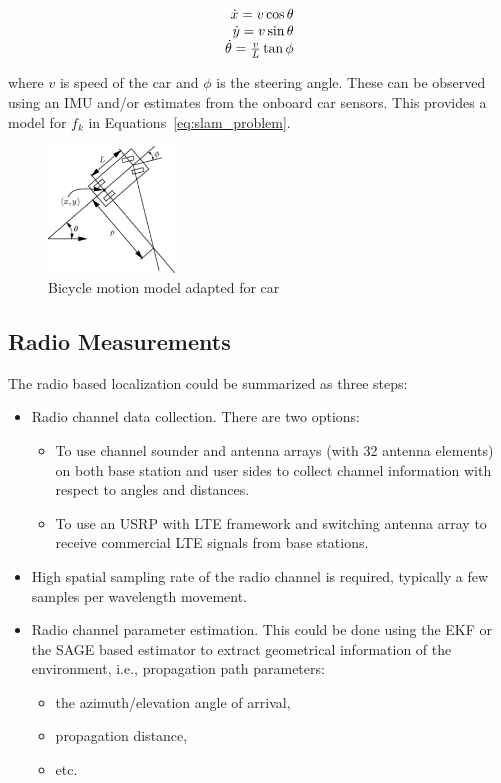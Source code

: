 \begin{equation}
 \begin{array}[b]{r}
  \dot{x}  = v \cos \theta \\
  \dot{y}  = v \sin \theta \\
  \dot{\theta}  = \frac{v}{L} \tan{\phi}
 \end{array}
\end{equation}

where $v$ is speed of the car and $\phi$ is the steering angle.
These can be observed using an \gls{IMU} and/or estimates from the onboard car
sensors. This provides a model for $f_k$ in Equations~\eqref{eq:slam_problem}.

\begin{figure}
\centering
\label{fig:motion_model}
\includegraphics[width=0.3\textwidth]{figures/bicycle_model.pdf}
\caption{Bicycle motion model adapted for car}
\end{figure}


\subsection{Radio Measurements}\label{sec:radio_measurements}


The radio based localization could be summarized as three steps:

\begin{itemize}
\item Radio channel data collection. There are two options:
  \begin{itemize}
  \item To use channel sounder and antenna arrays (with 32 antenna
    elements) on both base station and user sides to collect channel
    information with respect to angles and distances.
  \item To use an \gls{USRP} with \gls{LTE} framework and switching antenna array to
  receive commercial \gls{LTE} signals from base stations.
\end{itemize}
\item  High spatial sampling rate of the radio channel is required, typically a few samples per wavelength movement.
\item Radio channel parameter estimation. This could be done using the \gls{EKF} or the
\gls{SAGE} based estimator
to extract geometrical information of the environment, i.e., propagation path
parameters:
\begin{itemize}
\item the azimuth/elevation angle of arrival,
\item propagation
distance,
\item etc.
\end{itemize}
\end{itemize}

